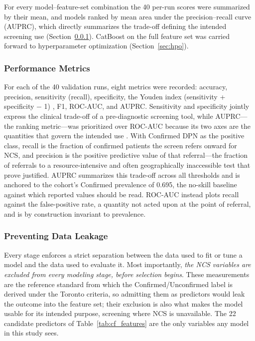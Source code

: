 \documentclass[pdflatex,sn-mathphys-num]{sn-jnl}%
\theoremstyle{thmstyleone}%
\theoremstyle{thmstyletwo}%
\theoremstyle{thmstylethree}%
\begin{document}
For every model--feature-set combination the 40 per-run scores were summarized by their mean, and
models ranked by mean area under the precision--recall curve (AUPRC), which directly summarizes the
trade-off defining the intended screening use (Section~\ref{sec:metrics}). CatBoost on the full
feature set was carried forward to hyperparameter optimization (Section~\ref{sec:hpo}).

\subsubsection{Performance Metrics}
\label{sec:metrics}
For each of the 40 validation runs, eight metrics were recorded: accuracy, precision, sensitivity
(recall), specificity, the Youden index (sensitivity + specificity $-$ 1) \cite{youden1950index}, F1,
ROC-AUC, and AUPRC. Sensitivity and specificity jointly
express the clinical trade-off of a pre-diagnostic screening tool, while AUPRC---the ranking
metric---was prioritized over ROC-AUC because its two axes are the quantities that govern the
intended use \cite{saito2015precision,davis2006relationship}. With Confirmed DPN as the positive class, recall is the fraction of confirmed patients
the screen refers onward for NCS, and precision is the positive predictive value of that
referral---the fraction of referrals to a resource-intensive and often geographically inaccessible
test that prove justified. AUPRC summarizes this trade-off across all thresholds and is anchored to
the cohort's Confirmed prevalence of 0.695, the no-skill baseline against which reported values
should be read. ROC-AUC instead plots recall against the false-positive rate, a quantity not acted
upon at the point of referral, and is by construction invariant to prevalence.

\subsubsection{Preventing Data Leakage}
\label{sec:leakage}

Every stage enforces a strict separation between the data used to fit or tune a model and the data
used to evaluate it. Most importantly, \textit{the NCS variables are excluded from every modeling
stage, before selection begins}. These measurements are the reference standard from which the
Confirmed/Unconfirmed label is derived under the Toronto criteria, so admitting them as predictors
would leak the outcome into the feature set; their exclusion is also what makes the model usable for
its intended purpose, screening where NCS is unavailable. The 22 candidate predictors of
Table~\ref{tab:cf_features} are the only variables any model in this study sees.
\end{document}
